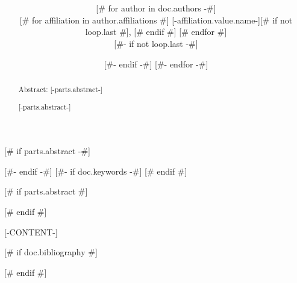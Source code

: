 \documentclass[draft, twoside, 11pt]{article}
[# else #]
\title{\bfseries\sffamily [-doc.title-]}
\date{\displaydate{articleDate}}
\author{[# for author in doc.authors -#]
\mdseries [-author.name-]\\
[#- if author.affiliations #]
[# for affiliation in author.affiliations #]
\small [-affiliation.value.name-][# if not loop.last #], [# endif #]
[# endfor #]\\
[#- endif -#]
[#- if not loop.last -#]
\and
[#- endif -#]
[#- endfor -#]
}
\begin{document}
\maketitle

\clearpage

\tableofcontents

[# if parts.abstract -#]
\begin{abstract}
Abstract: [-parts.abstract-]
\end{abstract}
[#- endif -#]
[#- if doc.keywords -#]
[# endif #]

[# if parts.abstract #]
\begin{abstract}
[-parts.abstract-]
\end{abstract}
[# endif #]

[-CONTENT-]

[# if doc.bibliography #]

[# endif #]
\end{document}
